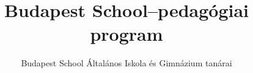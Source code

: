 \documentclass[magyar,12pt,a4paper,draft]{report}
\begin{document}
\newif\ifkerettanterv
\kerettantervfalse

\title{Budapest School–pedagógiai program}
\author{Budapest School Általános Iskola és Gimnázium tanárai}
\maketitle


\tableofcontents
\newpage
 



{}
\label{sec:bibliographyk}

 
\end{document}
